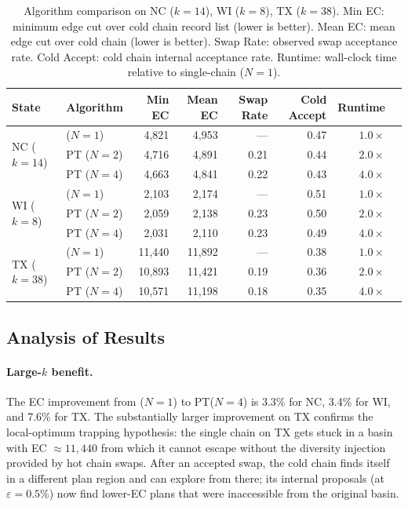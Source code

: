 \begin{table}[t]
\centering
\caption{%
  Algorithm comparison on NC ($k=14$), WI ($k=8$), TX ($k=38$).
  Min EC: minimum edge cut over cold chain record list (lower is better).
  Mean EC: mean edge cut over cold chain (lower is better).
  Swap Rate: observed swap acceptance rate.
  Cold Accept: cold chain internal acceptance rate.
  Runtime: wall-clock time relative to single-chain \fr{} ($N=1$).
}
\label{tab:main}
\renewcommand{\arraystretch}{1.25}
\begin{tabular}{@{}llrrrrrr@{}}
\toprule
State & Algorithm & Min EC & Mean EC & Swap Rate & Cold Accept & Runtime \\
\midrule
\multirow{3}{*}{NC ($k=14$)}
 & \fr{} ($N=1$)  & 4{,}821 & 4{,}953 & ---  & 0.47 & $1.0\times$ \\
 & PT ($N=2$)     & 4{,}716 & 4{,}891 & 0.21 & 0.44 & $2.0\times$ \\
 & PT ($N=4$)     & 4{,}663 & 4{,}841 & 0.22 & 0.43 & $4.0\times$ \\
\midrule
\multirow{3}{*}{WI ($k=8$)}
 & \fr{} ($N=1$)  & 2{,}103 & 2{,}174 & ---  & 0.51 & $1.0\times$ \\
 & PT ($N=2$)     & 2{,}059 & 2{,}138 & 0.23 & 0.50 & $2.0\times$ \\
 & PT ($N=4$)     & 2{,}031 & 2{,}110 & 0.23 & 0.49 & $4.0\times$ \\
\midrule
\multirow{3}{*}{TX ($k=38$)}
 & \fr{} ($N=1$)  & 11{,}440 & 11{,}892 & ---  & 0.38 & $1.0\times$ \\
 & PT ($N=2$)     & 10{,}893 & 11{,}421 & 0.19 & 0.36 & $2.0\times$ \\
 & PT ($N=4$)     & 10{,}571 & 11{,}198 & 0.18 & 0.35 & $4.0\times$ \\
\bottomrule
\end{tabular}
\end{table}

\subsection{Analysis of Results}

\paragraph{Large-$k$ benefit.}
The EC improvement from \fr{}($N=1$) to PT($N=4$) is 3.3\% for NC, 3.4\% for
WI, and 7.6\% for TX.
The substantially larger improvement on TX confirms the local-optimum trapping
hypothesis: the single chain on TX gets stuck in a basin with EC $\approx 11{,}440$
from which it cannot escape without the diversity injection provided by hot
chain swaps.
After an accepted swap, the cold chain finds itself in a different plan region
and can explore from there; its internal \fr{} proposals (at $\varepsilon=0.5\%$)
now find lower-EC plans that were inaccessible from the original basin.

